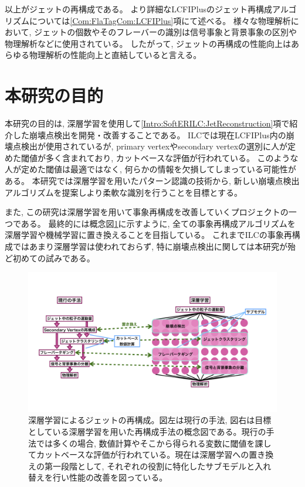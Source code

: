以上がジェットの再構成である。
より詳細なLCFIPlusのジェット再構成アルゴリズムについては\ref{Com:FlaTagCom:LCFIPlus}項にて述べる。
様々な物理解析において, ジェットの個数やそのフレーバーの識別は信号事象と背景事象の区別や物理解析などに使用されている。
したがって, ジェットの再構成の性能向上はあらゆる物理解析の性能向上と直結していると言える。


\section{本研究の目的} \label{Intro:Purpose}

本研究の目的は, 深層学習を使用して\ref{Intro:SoftERILC:JetReconstruction}項で紹介した崩壊点検出を開発・改善することである。
ILCでは現在LCFIPlus内の崩壊点検出が使用されているが, primary vertexやsecondary vertexの選別に人が定めた閾値が多く含まれており, カットベースな評価が行われている。
このような人が定めた閾値は最適ではなく, 何らかの情報を欠損してしまっている可能性がある。
本研究では深層学習を用いたパターン認識の技術から, 新しい崩壊点検出アルゴリズムを提案しより柔軟な識別を行うことを目標とする。

また, この研究は深層学習を用いて事象再構成を改善していくプロジェクトの一つである。
最終的には概念図\ref{7JetReconstructionwithDeepLearning}に示すように, 全ての事象再構成アルゴリズムを深層学習や機械学習に置き換えることを目指している。
これまでILCの事象再構成ではあまり深層学習は使われておらず, 特に崩壊点検出に関しては本研究が殆ど初めての試みである。

\begin{figure}[htbp]
 \centering
 \includegraphics[trim = 0 100 0 50, width=1.0\textwidth, clip]{Figure/1Introduction/7JetReconstructionwithDeepLearning.png}
 \caption[深層学習によるジェットの再構成]{深層学習によるジェットの再構成。図左は現行の手法, 図右は目標としている深層学習を用いた再構成手法の概念図である。現行の手法では多くの場合, 数値計算やそこから得られる変数に閾値を課してカットベースな評価が行われている。現在は深層学習への置き換えの第一段階として, それぞれの役割に特化したサブモデルと入れ替えを行い性能の改善を図っている。}
 \label{7JetReconstructionwithDeepLearning}
\end{figure}

